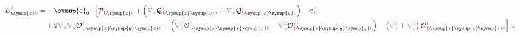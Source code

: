 \begin{subequations}
\begin{align}
	E^{\;\!\mathcolor{gray}{t}}_{\;\! \symup{z}\mathcolor{gray}{0}} = &- {\symup{\varepsilon}}_0^{-1} \left[ {\mathcal{P}}^{\;\!\mathcolor{gray}{t}}_{\;\!\textcolor{Maroon}{\text{b}} \symup{z} \mathcolor{gray}{0}} + \left( \mathcolor{gray}{\nabla_x} {\mathcal{Q}}^{\;\!\mathcolor{gray}{t}}_{\;\!\textcolor{Maroon}{\text{b}} \symup{z} \symup{x} \mathcolor{gray}{0}} + \mathcolor{gray}{\nabla_y} {\mathcal{Q}}^{\;\!\mathcolor{gray}{t}}_{\;\!\textcolor{Maroon}{\text{b}} \symup{z} \symup{y} \mathcolor{gray}{0}} \right) - {\sigma}^{\;\!\mathcolor{gray}{t}}_{\;\! \mathcolor{gray}{0}} \right. \label{eq:E_z0'} \\ & \left. +\hspace{0.2em} 2 \mathcolor{gray}{\nabla_x} \mathcolor{gray}{\nabla_y} {\mathcal{O}}^{\;\!\mathcolor{gray}{t}}_{\;\!\textcolor{Maroon}{\text{b}} \symup{x} \symup{y} \symup{z} \mathcolor{gray}{0}} + \left( \mathcolor{gray}{\nabla_x^2} {\mathcal{O}}^{\;\!\mathcolor{gray}{t}}_{\;\!\textcolor{Maroon}{\text{b}} \symup{z} \symup{x} \symup{x} \mathcolor{gray}{0}} + \mathcolor{gray}{\nabla_y^2} {\mathcal{O}}^{\;\!\mathcolor{gray}{t}}_{\;\!\textcolor{Maroon}{\text{b}} \symup{z} \symup{y} \symup{y} \mathcolor{gray}{0}} \right) - \left( \mathcolor{gray}{\nabla_x^2} + \mathcolor{gray}{\nabla_y^2} \right) {\mathcal{O}}^{\;\!\mathcolor{gray}{t}}_{\;\!\textcolor{Maroon}{\text{b}} \symup{z} \symup{z} \symup{z} \mathcolor{gray}{0}} \right] ~.
\end{align}
\end{subequations}

